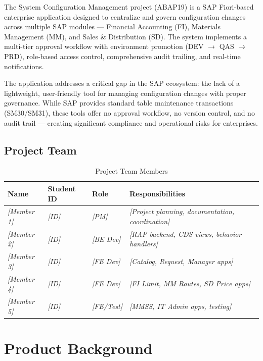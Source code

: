 \documentclass[12pt,a4paper]{report}
\newcommand{\placeholder}[1]{\textcolor{placeholderblue}{\textit{[#1]}}}
\begin{document}
The System Configuration Management project (ABAP19) is a SAP Fiori-based enterprise application designed to centralize and govern configuration changes across multiple SAP modules --- Financial Accounting (FI), Materials Management (MM), and Sales \& Distribution (SD). The system implements a multi-tier approval workflow with environment promotion (DEV $\rightarrow$ QAS $\rightarrow$ PRD), role-based access control, comprehensive audit trailing, and real-time notifications.

The application addresses a critical gap in the SAP ecosystem: the lack of a lightweight, user-friendly tool for managing configuration changes with proper governance. While SAP provides standard table maintenance transactions (SM30/SM31), these tools offer no approval workflow, no version control, and no audit trail --- creating significant compliance and operational risks for enterprises.

\subsection{Project Team}

\begin{table}[H]
\centering\small
\begin{tabularx}{\textwidth}{|l|l|l|X|}
  \hline
  \rowcolor{tableheadpeach}
  \textbf{Name} & \textbf{Student ID} & \textbf{Role} & \textbf{Responsibilities} \\ \hline
  \placeholder{Member 1} & \placeholder{ID} & \placeholder{PM}  & \placeholder{Project planning, documentation, coordination} \\ \hline
  \placeholder{Member 2} & \placeholder{ID} & \placeholder{BE Dev}  & \placeholder{RAP backend, CDS views, behavior handlers} \\ \hline
  \placeholder{Member 3} & \placeholder{ID} & \placeholder{FE Dev}  & \placeholder{Catalog, Request, Manager apps} \\ \hline
  \placeholder{Member 4} & \placeholder{ID} & \placeholder{FE Dev}  & \placeholder{FI Limit, MM Routes, SD Price apps} \\ \hline
  \placeholder{Member 5} & \placeholder{ID} & \placeholder{FE/Test} & \placeholder{MMSS, IT Admin apps, testing} \\ \hline
\end{tabularx}
\caption{Project Team Members}
\label{tab:team}
\end{table}


\section{Product Background}
\end{document}
